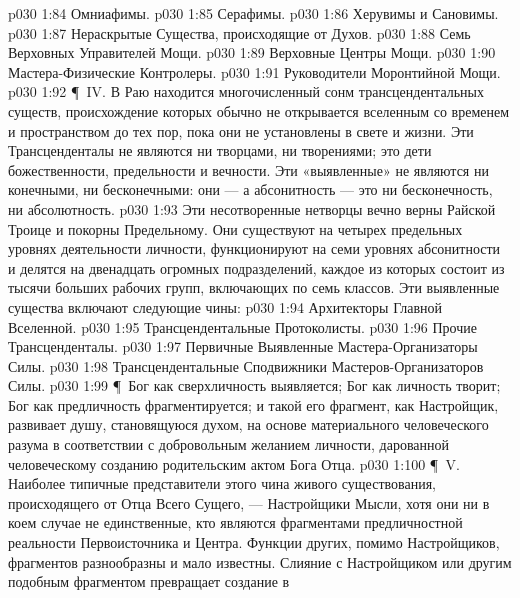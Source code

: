 \vs p030 1:84 \bibnobreakspace Омниафимы.
\vs p030 1:85 \bibnobreakspace Серафимы.
\vs p030 1:86 \bibnobreakspace Херувимы и Сановимы.
\vs p030 1:87 \bibnobreakspace Нераскрытые Существа, происходящие от Духов.
\vs p030 1:88 \bibnobreakspace Семь Верховных Управителей Мощи.
\vs p030 1:89 \bibnobreakspace Верховные Центры Мощи.
\vs p030 1:90 \bibnobreakspace Мастера\hyp{}Физические Контролеры.
\vs p030 1:91 \bibnobreakspace Руководители Моронтийной Мощи.
\vs p030 1:92 \P\ IV.  В Раю находится многочисленный сонм трансцендентальных существ, происхождение которых обычно не открывается вселенным со временем и пространством до тех пор, пока они не установлены в свете и жизни. Эти Трансценденталы не являются ни творцами, ни творениями; это  дети божественности, предельности и вечности. Эти «выявленные» не являются ни конечными, ни бесконечными: они ---  а абсонитность --- это ни бесконечность, ни абсолютность.
\vs p030 1:93 Эти несотворенные нетворцы вечно верны Райской Троице и покорны Предельному. Они существуют на четырех предельных уровнях деятельности личности, функционируют на семи уровнях абсонитности и делятся на двенадцать огромных подразделений, каждое из которых состоит из тысячи больших рабочих групп, включающих по семь классов. Эти выявленные существа включают следующие чины:
\vs p030 1:94 \bibnobreakspace Архитекторы Главной Вселенной.
\vs p030 1:95 \bibnobreakspace Трансцендентальные Протоколисты.
\vs p030 1:96 \bibnobreakspace Прочие Трансценденталы.
\vs p030 1:97 \bibnobreakspace Первичные Выявленные Мастера\hyp{}Организаторы Силы.
\vs p030 1:98 \bibnobreakspace Трансцендентальные Сподвижники Мастеров\hyp{}Организаторов Силы.
\vs p030 1:99 \P\ Бог как сверхличность выявляется; Бог как личность творит; Бог как предличность фрагментируется; и такой его фрагмент, как Настройщик, развивает душу, становящуюся духом, на основе материального человеческого разума в соответствии с добровольным желанием личности, дарованной человеческому созданию родительским актом Бога Отца.
\vs p030 1:100 \P\ V.  Наиболее типичные представители этого чина живого существования, происходящего от Отца Всего Сущего, --- Настройщики Мысли, хотя они ни в коем случае не единственные, кто являются фрагментами предличностной реальности Первоисточника и Центра. Функции других, помимо Настройщиков, фрагментов разнообразны и мало известны. Слияние с Настройщиком или другим подобным фрагментом превращает создание в 
